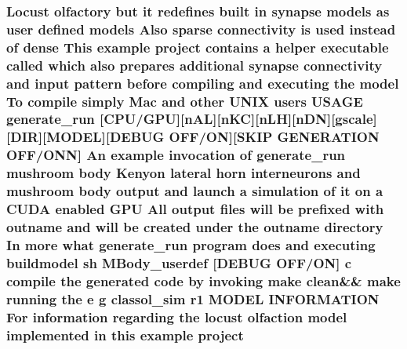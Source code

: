 \hypertarget{userproject_2MBody__userdef__project_2README_8txt_a0479123d57feed09329a386ae49747e4}{
\subsubsection[{project}]{\setlength{\rightskip}{0pt plus 5cm}Locust olfactory but {\bf it} redefines built {\bf in} synapse models as user defined models Also sparse connectivity {\bf is} used instead of dense This example project contains a helper executable called which also prepares additional synapse connectivity and input pattern before compiling and executing the {\bf model} To compile simply Mac and other U\+N\+I\+X users U\+S\+A\+G\+E {\bf generate\+\_\+run} \mbox{[}{\bf C\+P\+U}/{\bf G\+P\+U}\mbox{]}\mbox{[}n\+A\+L\mbox{]}\mbox{[}n\+K\+C\mbox{]}\mbox{[}n\+L\+H\mbox{]}\mbox{[}n\+D\+N\mbox{]}\mbox{[}gscale\mbox{]}\mbox{[}D\+I\+R\mbox{]}\mbox{[}M\+O\+D\+E\+L\mbox{]}\mbox{[}D\+E\+B\+U\+G O\+F\+F/O\+N\mbox{]}\mbox{[}S\+K\+I\+P G\+E\+N\+E\+R\+A\+T\+I\+O\+N O\+F\+F/O\+N\+N\mbox{]} An example invocation of {\bf generate\+\_\+run} mushroom body Kenyon lateral horn {\bf interneurons} and mushroom body output and launch a simulation of {\bf it} on a C\+U\+D\+A enabled {\bf G\+P\+U} All output files will be prefixed {\bf with} outname and will be created under the outname {\bf directory} In more what {\bf generate\+\_\+run} program does and executing buildmodel sh M\+Body\+\_\+userdef \mbox{[}D\+E\+B\+U\+G O\+F\+F/O\+N\mbox{]} c compile the generated {\bf code} by invoking make clean\&\& make running the e g classol\+\_\+sim r1 M\+O\+D\+E\+L I\+N\+F\+O\+R\+M\+A\+T\+I\+O\+N For information regarding the locust olfaction {\bf model} implemented {\bf in} this example project}}\label{userproject_2MBody__userdef__project_2README_8txt_a0479123d57feed09329a386ae49747e4}
